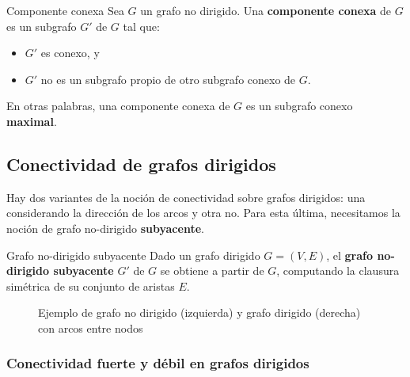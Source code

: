 \begin{definitionblock}{Componente conexa}
Sea $G$ un grafo no dirigido. Una \textbf{componente conexa} de $G$ es un subgrafo $G'$ de $G$ tal que:
\begin{itemize}
  \item $G'$ es conexo, y
  \item $G'$ no es un subgrafo propio de otro subgrafo conexo de $G$.
\end{itemize}
En otras palabras, una componente conexa de $G$ es un subgrafo conexo \textbf{maximal}.
\end{definitionblock}

\subsection{Conectividad de grafos dirigidos}

Hay dos variantes de la noción de conectividad sobre grafos dirigidos: una considerando la dirección de los arcos y otra no. Para esta última, necesitamos la noción de grafo no-dirigido \textbf{subyacente}.

\begin{definitionblock}{Grafo no-dirigido subyacente}
Dado un grafo dirigido $G = (V,E)$, el \textbf{grafo no-dirigido subyacente} $G'$ de $G$ se obtiene a partir de $G$, computando la clausura simétrica de su conjunto de aristas $E$.
\end{definitionblock}

\begin{figure}[h!]
  \centering
  \caption{Ejemplo de grafo no dirigido (izquierda) y grafo dirigido (derecha) con arcos entre nodos}
\end{figure}

\subsubsection{Conectividad fuerte y débil en grafos dirigidos}

